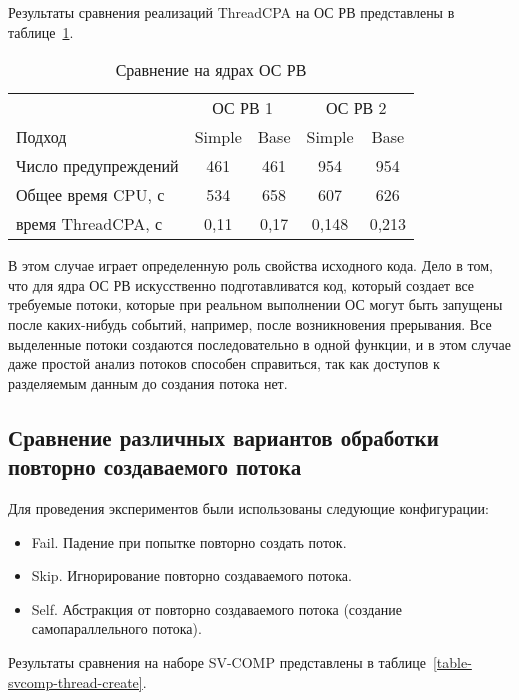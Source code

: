 Результаты сравнения реализаций ThreadCPA на ОС РВ представлены в таблице~\ref{table-os-thread}.

  \begin{table}[h]\footnotesize \centering
    \caption{Сравнение на ядрах ОС РВ}
  	\label{table-os-thread}
    \begin{tabular}{ | l | c | c | c | c |}
      \hline
      		& 		\multicolumn{2}{|c|}{ОС РВ 1} & \multicolumn{2}{|c|}{ОС РВ 2} 	\\
      Подход         					& Simple 	& Base 	& Simple 	& Base 		\\ \hline
      Число предупреждений 				& 461    	& 461   & 954      	& 954  		\\ 
      Общее время CPU, с				& 534      	& 658   & 607      	& 626  		\\ 
  \hspace{0.5cm} время ThreadCPA, с 	& 0,11 		& 0,17  & 0,148    	& 0,213   	\\
      \hline
    \end{tabular}
  \end{table}

В этом случае играет определенную роль свойства исходного кода.
Дело в том, что для ядра ОС РВ искусственно подготавливатся код, который создает все требуемые потоки, которые при реальном выполнении ОС могут быть запущены после каких-нибудь событий, например, после возникновения прерывания.
Все выделенные потоки создаются последовательно в одной функции, и в этом случае даже простой анализ потоков способен справиться, так как доступов к разделяемым данным до создания потока нет.


\subsection{Сравнение различных вариантов обработки повторно создаваемого потока }

Для проведения экспериментов были использованы следующие конфигурации:

\begin{itemize}
\item Fail. Падение при попытке повторно создать поток.
\item Skip. Игнорирование повторно создаваемого потока.
\item Self. Абстракция от повторно создаваемого потока (создание самопараллельного потока).
\end{itemize}

Результаты сравнения на наборе SV-COMP представлены в таблице~\ref{table-svcomp-thread-create}.

